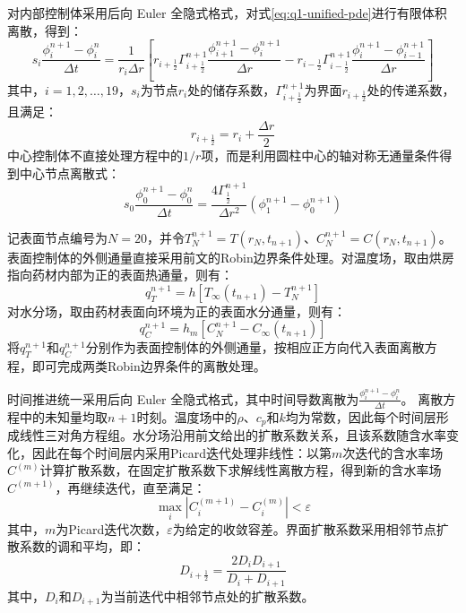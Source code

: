 \documentclass[withoutpreface,bwprint]{cumcmthesis}
\begin{document}
对内部控制体采用后向 Euler 全隐式格式，对式\eqref{eq:q1-unified-pde}进行有限体积离散，得到：
\begin{equation}
s_i
\frac{\phi_i^{n+1}-\phi_i^n}{\Delta t}
=
\frac{1}{r_i\Delta r}
\left[
r_{i+\frac12}\Gamma_{i+\frac12}^{n+1}
\frac{\phi_{i+1}^{n+1}-\phi_i^{n+1}}{\Delta r}
-
r_{i-\frac12}\Gamma_{i-\frac12}^{n+1}
\frac{\phi_i^{n+1}-\phi_{i-1}^{n+1}}{\Delta r}
\right]
\label{eq:q1-fvm-interior}
\end{equation}
其中，$i=1,2,\ldots,19$，$s_i$为节点$r_i$处的储存系数，$\Gamma_{i+\frac12}^{n+1}$为界面$r_{i+\frac12}$处的传递系数，且满足：
\begin{equation}
r_{i+\frac12}=r_i+\frac{\Delta r}{2}
\label{eq:q1-fvm-face}
\end{equation}
中心控制体不直接处理方程中的$1/r$项，而是利用圆柱中心的轴对称无通量条件得到中心节点离散式：
\begin{equation}
s_0
\frac{\phi_0^{n+1}-\phi_0^n}{\Delta t}
=
\frac{4\Gamma_{\frac12}^{n+1}}{\Delta r^2}
\left(\phi_1^{n+1}-\phi_0^{n+1}\right)
\label{eq:q1-fvm-center}
\end{equation}

记表面节点编号为$N=20$，并令$T_N^{n+1}=T(r_N,t_{n+1})$、$C_N^{n+1}=C(r_N,t_{n+1})$。表面控制体的外侧通量直接采用前文的Robin边界条件处理。对温度场，取由烘房指向药材内部为正的表面热通量，则有：
\begin{equation}
q_T^{n+1}
=
h\left[
T_\infty(t_{n+1})-T_N^{n+1}
\right]
\label{eq:q1-surface-heat-flux}
\end{equation}
对水分场，取由药材表面向环境为正的表面水分通量，则有：
\begin{equation}
q_C^{n+1}
=
h_m\left[
C_N^{n+1}-C_\infty(t_{n+1})
\right]
\label{eq:q1-surface-moisture-flux}
\end{equation}
将$q_T^{n+1}$和$q_C^{n+1}$分别作为表面控制体的外侧通量，按相应正方向代入表面离散方程，即可完成两类Robin边界条件的离散处理。

时间推进统一采用后向 Euler 全隐式格式，其中时间导数离散为$\frac{\phi_i^{n+1}-\phi_i^n}{\Delta t}$。
离散方程中的未知量均取$n+1$时刻。温度场中的$\rho$、$c_p$和$k$均为常数，因此每个时间层形成线性三对角方程组。水分场沿用前文给出的扩散系数关系，且该系数随含水率变化，因此在每个时间层内采用Picard迭代处理非线性：以第$m$次迭代的含水率场$C^{(m)}$计算扩散系数，在固定扩散系数下求解线性离散方程，得到新的含水率场$C^{(m+1)}$，再继续迭代，直至满足：
\begin{equation}
\max_i\left|C_i^{(m+1)}-C_i^{(m)}\right|<\varepsilon
\label{eq:q1-picard-convergence}
\end{equation}
其中，$m$为Picard迭代次数，$\varepsilon$为给定的收敛容差。界面扩散系数采用相邻节点扩散系数的调和平均，即：
\begin{equation}
D_{i+\frac12}
=
\frac{2D_iD_{i+1}}{D_i+D_{i+1}}
\label{eq:q1-harmonic-diffusivity}
\end{equation}
其中，$D_i$和$D_{i+1}$为当前迭代中相邻节点处的扩散系数。
\end{document}
